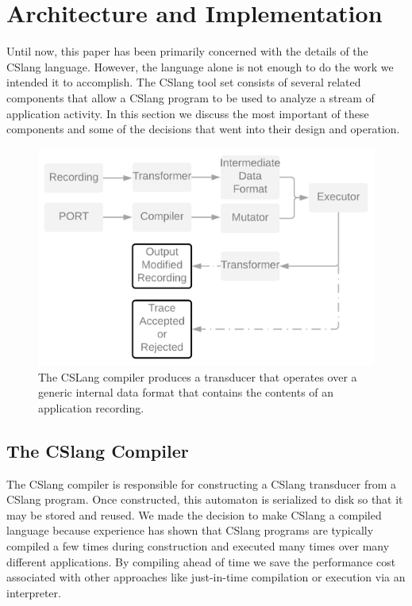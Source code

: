 \section{Architecture and Implementation}

Until now, this paper has been primarily concerned with the details of the
CSlang language.  However, the language alone is not enough to do the work
we intended it to accomplish.  The CSlang tool set
consists of several related
components that allow a CSlang program to be used to analyze a stream of
application activity.
In this section we discuss the most important of these components and some
of the decisions that went into their design and operation.

\label{SEC:architecture}

\begin{figure}
  \includegraphics[scale=.08]{images/architecture}
  \caption{The CSLang compiler produces a transducer that operates over a
  generic internal data format that contains the contents of an application
  recording.}
  \label{fig:architecture}
\end{figure}

\subsection{The CSlang Compiler}

The CSlang compiler is responsible for constructing a CSlang transducer
from a CSlang program.  Once constructed, this automaton is serialized to
disk so that it may be stored and reused.
We made the decision to make CSlang a compiled language because
experience has shown that CSlang programs are typically
compiled a few times during construction
and executed many times over many different applications.
By compiling ahead of time we save the performance cost associated with other
approaches like just-in-time compilation or execution via an interpreter.


